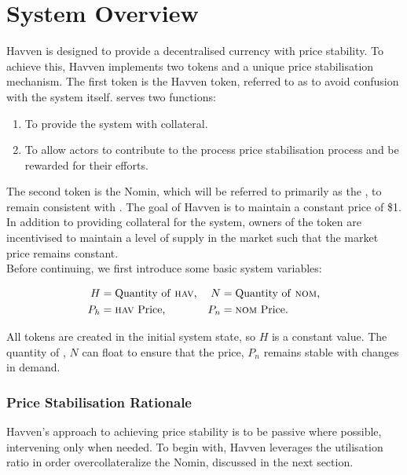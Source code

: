 \section{System Overview} Havven is designed to provide a decentralised currency with price stability. To achieve this, Havven implements two tokens and a unique price stabilisation mechanism. The first token is the Havven token, referred to as \HAV{} to avoid confusion with the system itself. \HAV{} serves two functions:

\begin{enumerate}
\item{To provide the system with collateral.}
\item{To allow actors to contribute to the process price stabilisation process and be rewarded for their efforts.}
\end{enumerate}

\noindent The second token is the Nomin, which will be referred to primarily as the \NOM{}, to remain consistent with \HAV{}. The goal of Havven is to maintain a constant \NOM{} price of \$1. In addition to providing collateral for the system, owners of the \HAV{} token are incentivised to maintain a level of supply in the \NOM{} market such that the market price remains constant. \\

\noindent Before continuing, we first introduce some basic system variables:

\begin{align*}
H &= \text{Quantity of \textsc{hav}{},} & N &= \text{Quantity of \textsc{nom}{},} \\
P_h &= \text{\textsc{hav}{} Price,}  & P_n &= \text{\textsc{nom}{} Price.}
\end{align*}

\noindent All \HAV{} tokens are created in the initial system state, so $H$ is a constant value. The quantity of \NOM{}, $N$ can float to ensure that the \NOM{} price, $P_n$ remains stable with changes in demand.

\subsubsection*{Price Stabilisation Rationale} Havven's approach to achieving price stability is to be passive where possible, intervening only when needed. To begin with, Havven leverages the utilisation ratio in order overcollateralize the Nomin, discussed in the next section. \\

